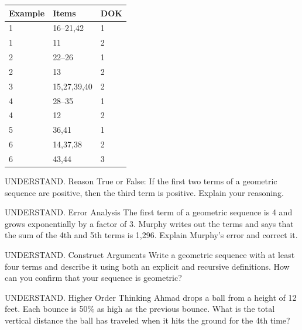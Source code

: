 \documentclass{article}
\newenvironment{item-analysis}{}{}      %
\newenvironment{practice}[2]{}{}        %
\newcommand{\answer}[1]{}               %
\newcommand{\placeholder}[2]{}          %
\begin{document}
\begin{item-analysis}
\begin{tabular}{lll}
\toprule
Example & Items & DOK \\
\midrule
1 & 16--21,42 & 1 \\
1 & 11 & 2 \\
2 & 22--26 & 1 \\
2 & 13 & 2 \\
3 & 15,27,39,40 & 2 \\
4 & 28--35 & 1 \\
4 & 12 & 2 \\
5 & 36,41 & 1 \\
6 & 14,37,38 & 2 \\
6 & 43,44 & 3 \\
\bottomrule
\end{tabular}
\end{item-analysis}
\begin{practice}{11}{2}
UNDERSTAND. Reason True or False: If the first two terms of a geometric sequence are positive, then the third term is positive. Explain your reasoning.
\answer{True; If the first two terms are positive, the common ratio must be positive.}
\end{practice}
\begin{practice}{12}{2}
UNDERSTAND. Error Analysis The first term of a geometric sequence is 4 and grows exponentially by a factor of 3. Murphy writes out the terms and says that the sum of the 4th and 5th terms is 1,296. Explain Murphy's error and correct it.
\answer{He added terms 5 and 6 together. The actual answer is 432.}
\end{practice}
\begin{practice}{13}{2}
UNDERSTAND. Construct Arguments Write a geometric sequence with at least four terms and describe it using both an explicit and recursive definitions. How can you confirm that your sequence is geometric?
\answer{Check students' answers.}
\end{practice}
\begin{practice}{14}{2}
UNDERSTAND. Higher Order Thinking Ahmad drops a ball from a height of 12 feet. Each bounce is 50\% as high as the previous bounce. What is the total vertical distance the ball has traveled when it hits the ground for the 4th time?
\placeholder{graph}{Ball bounce graph with black arrowed x and y axes, origin O; x ticks every 0.5 labeled 1,2,3,4; y ticks every 3 labeled 6,12. Red trajectory starts at (0,12), reaches ground (1,0), peaks (1.5,6), reaches (2,0), peaks (2.5,3), reaches (3,0), peaks (3.5,1.5), reaches (4,0), with an arrow toward the final contact.}
\answer{33 feet}
\end{practice}
\end{document}
